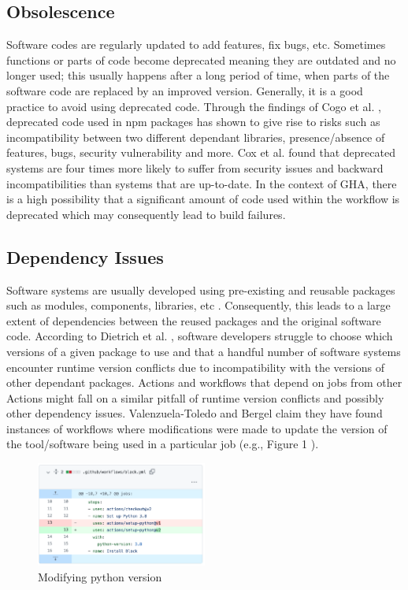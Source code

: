 \documentclass[conference]{IEEEtran}
\begin{document}
    \subsection{Obsolescence}
        Software codes are regularly updated to add features, fix bugs, etc. Sometimes functions or parts of code become deprecated meaning they are outdated and no longer used; this usually happens after a long period of time, when parts of the software code are replaced by an improved version. Generally, it is a good practice to avoid using deprecated code. Through the findings of Cogo et al. \cite{cogo2021deprecation}, deprecated code used in npm packages has shown to give rise to risks such as incompatibility between two different dependant libraries, presence/absence of features, bugs, security vulnerability and more. Cox et al. \cite{cox2015measuring} found that deprecated systems are four times more likely to suffer from security issues and backward incompatibilities than systems that are up-to-date. In the context of GHA, there is a high possibility that a significant amount of code used within the workflow is deprecated which may consequently lead to build failures.

    \subsection{Dependency Issues}
        Software systems are usually developed using pre-existing and reusable packages such as modules, components, libraries, etc \cite{decan2019empirical}\cite{soto2021comprehensive}. Consequently, this leads to a large extent of dependencies between the reused packages and the original software code. According to Dietrich et al. \cite{dietrich2019dependency}, software developers struggle to choose which versions of a given package to use and that a handful number of software systems encounter runtime version conflicts due to incompatibility with the versions of other dependant packages. Actions and workflows that depend on jobs from other Actions might fall on a similar pitfall of runtime version conflicts and possibly other dependency issues. Valenzuela-Toledo and Bergel \cite{valenzuela2022evolution} claim they have found instances of workflows where modifications were made to update the version of the tool/software being used in a particular job (e.g., Figure 1 \cite{valenzuela2022evolution}  ).

\begin{figure} [h]
\includegraphics[width=0.5\textwidth]{Figure 1.png}
\caption{Modifying python version \cite{valenzuela2022evolution} }
\end{figure}
\end{document}

